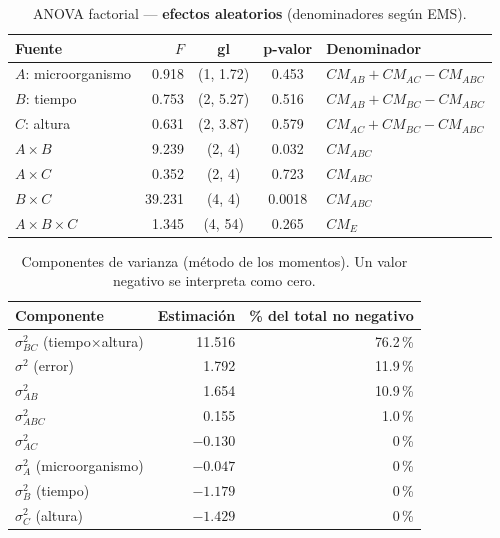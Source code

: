 \documentclass[12pt,a4paper]{article}
\begin{document}
\begin{table}[H]
\centering
\caption{ANOVA factorial --- \textbf{efectos aleatorios} (denominadores según EMS).}
\begin{tabular}{lrccl}
\toprule
\textbf{Fuente} & \textbf{$F$} & \textbf{gl} & \textbf{p-valor} & \textbf{Denominador}\\
\midrule
$A$: microorganismo & 0.918 & (1, 1.72) & 0.453 & $CM_{AB}+CM_{AC}-CM_{ABC}$\\
$B$: tiempo         & 0.753 & (2, 5.27) & 0.516 & $CM_{AB}+CM_{BC}-CM_{ABC}$\\
$C$: altura         & 0.631 & (2, 3.87) & 0.579 & $CM_{AC}+CM_{BC}-CM_{ABC}$\\
$A\times B$         & 9.239 & (2, 4)    & 0.032 & $CM_{ABC}$\\
$A\times C$         & 0.352 & (2, 4)    & 0.723 & $CM_{ABC}$\\
$B\times C$         & 39.231& (4, 4)    & 0.0018& $CM_{ABC}$\\
$A\times B\times C$ & 1.345 & (4, 54)   & 0.265 & $CM_{E}$\\
\bottomrule
\end{tabular}
\end{table}

\begin{table}[H]
\centering
\caption{Componentes de varianza (método de los momentos). Un valor negativo se interpreta como cero.}
\begin{tabular}{lrr}
\toprule
\textbf{Componente} & \textbf{Estimación} & \textbf{\% del total no negativo}\\
\midrule
$\sigma^2_{BC}$ (tiempo$\times$altura) & 11.516  & 76.2\,\%\\
$\sigma^2$ (error)                     & 1.792   & 11.9\,\%\\
$\sigma^2_{AB}$                        & 1.654   & 10.9\,\%\\
$\sigma^2_{ABC}$                       & 0.155   & 1.0\,\%\\
$\sigma^2_{AC}$                        & $-0.130$ & 0\,\%\\
$\sigma^2_{A}$ (microorganismo)        & $-0.047$ & 0\,\%\\
$\sigma^2_{B}$ (tiempo)                & $-1.179$ & 0\,\%\\
$\sigma^2_{C}$ (altura)                & $-1.429$ & 0\,\%\\
\bottomrule
\end{tabular}
\end{table}
\end{document}
